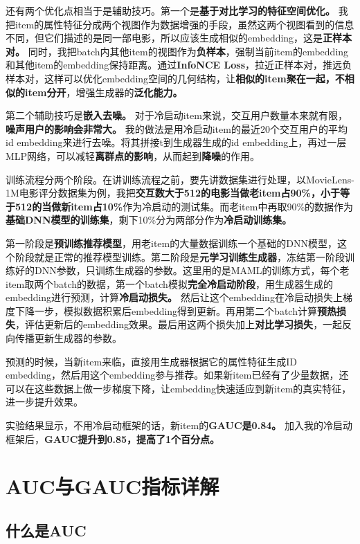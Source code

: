 \documentclass[UTF8]{ctexart}
\begin{document}
还有两个优化点相当于是辅助技巧。第一个是\textbf{基于对比学习的特征空间优化。} 我把item的属性特征分成两个视图作为数据增强的手段，虽然这两个视图看到的信息不同，但它们描述的是同一部电影，所以应该生成相似的embedding，这是\textbf{正样本对。} 同时，我把batch内其他item的视图作为\textbf{负样本}，强制当前item的embedding和其他item的embedding保持距离。通过\textbf{InfoNCE Loss}，拉近正样本对，推远负样本对，这样可以优化embedding空间的几何结构，让\textbf{相似的item聚在一起，不相似的item分开}，增强生成器的\textbf{泛化能力。}

第二个辅助技巧是\textbf{嵌入去噪。} 对于冷启动item来说，交互用户数量本来就有限，\textbf{噪声用户的影响会非常大。} 我的做法是用冷启动item的最近20个交互用户的平均id embedding来进行去噪。将其拼接t到生成器生成的id embedding上，再过一层MLP网络，可以减轻\textbf{离群点的影响}，从而起到\textbf{降噪}的作用。


训练流程分两个阶段。在讲训练流程之前，要先讲数据集进行处理，以MovieLens-1M电影评分数据集为例，我把\textbf{交互数大于512的电影当做老item占90\%，小于等于512的当做新item占10\%}作为冷启动的测试集。而老item中再取90\%的数据作为\textbf{基础DNN模型的训练集}，剩下10\%分为两部分作为\textbf{冷启动训练集。}

第一阶段是\textbf{预训练推荐模型}，用老item的大量数据训练一个基础的DNN模型，这个阶段就是正常的推荐模型训练。第二阶段是\textbf{元学习训练生成器}，冻结第一阶段训练好的DNN参数，只训练生成器的参数。这里用的是MAML的训练方式，每个老item取两个batch的数据，第一个batch模拟\textbf{完全冷启动阶段}，用生成器生成的embedding进行预测，计算\textbf{冷启动损失。} 然后让这个embedding在冷启动损失上梯度下降一步，模拟数据积累后embedding得到更新。再用第二个batch计算\textbf{预热损失}，评估更新后的embedding效果。最后用这两个损失加上\textbf{对比学习损失}，一起反向传播更新生成器的参数。

预测的时候，当新item来临，直接用生成器根据它的属性特征生成ID embedding，然后用这个embedding参与推荐。如果新item已经有了少量数据，还可以在这些数据上做一步梯度下降，让embedding快速适应到新item的真实特征，进一步提升效果。

实验结果显示，不用冷启动框架的话，新item的\textbf{GAUC是0.84。} 加入我的冷启动框架后，\textbf{GAUC提升到0.85，提高了1个百分点。}

\section{AUC与GAUC指标详解}

\subsection{什么是AUC}
\end{document}
